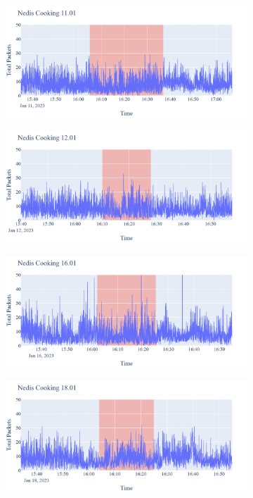 \begin{figure}[H]
\begin{subfigure}[b]{0.5\textwidth}
        \centering
        \includegraphics[width=1.2\hsize]{figures/Nedis_Cooking_Packets_11.01.png}
    \end{subfigure}
    \begin{subfigure}[b]{0.5\textwidth}
        \centering
        \includegraphics[width=1.2\hsize]{figures/Nedis_Cooking_Packets_12.01.png}
    \end{subfigure}
    \begin{subfigure}[b]{0.5\textwidth}
        \centering
        \includegraphics[width=1.2\hsize]{figures/Nedis_Cooking_Packets_16.01.png}
    \end{subfigure}
    \begin{subfigure}[b]{0.5\textwidth}
        \centering
        \includegraphics[width=1.2\hsize]{figures/Nedis_Cooking_Packets_18.01.png}

\end{subfigure}
\end{figure}
